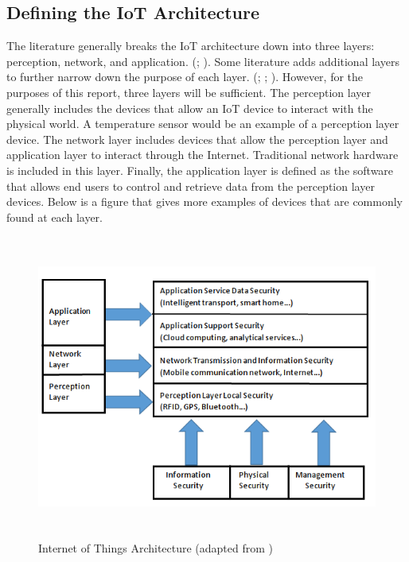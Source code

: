 \documentclass[letterpaper, 12pt]{article}
\begin{document}
\begin{flushleft}
\subsection*{Defining the IoT Architecture}
The literature generally breaks the IoT architecture down into three layers: perception, network, and application. (\cite{Zhao6746513}; \cite{Xiaohui6643029}). Some literature adds additional layers to further narrow down the purpose of each
layer. (\cite{Granjal7005393}; \cite{Kozlov}; \cite{Suo6188257}). However, for the purposes of this report, three layers will be sufficient. The perception layer 
generally includes the devices that allow an IoT device to interact with the physical world. A temperature sensor would be an example of a
perception layer device. The network layer includes devices that allow the perception layer and application layer to interact through the Internet.
Traditional network hardware is included in this layer. Finally, the application layer is defined as the software that allows end users to control
and retrieve data from the perception layer devices. Below is a figure that gives more examples of devices that are commonly found at each layer.

\begin{figure}[H]
	\includegraphics[width=\linewidth,height=10cm,keepaspectratio]{figure2_new.png}
	\caption[Internet of Things Architecture]{Internet of Things Architecture (adapted from \cite{Zhao6746513})}
	\label{fig:arch}
\end{figure}


\end{flushleft}
\end{document}
